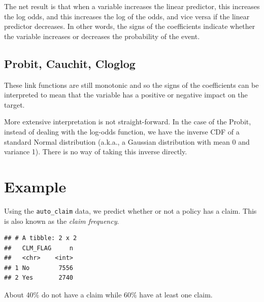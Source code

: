 \documentclass[openany]{book}
\newenvironment{Shaded}{\begin{snugshade}}{\end{snugshade}}
\newcommand{\KeywordTok}[1]{\textcolor[rgb]{0.13,0.29,0.53}{\textbf{#1}}}
\newcommand{\NormalTok}[1]{#1}
\newcommand{\OperatorTok}[1]{\textcolor[rgb]{0.81,0.36,0.00}{\textbf{#1}}}
\newcommand{\StringTok}[1]{\textcolor[rgb]{0.31,0.60,0.02}{#1}}
\begin{document}
The net result is that when a variable increases the linear predictor, this increases the log odds, and this increases the log of the odds, and vice versa if the linear predictor decreases. In other words, the signs of the coefficients indicate whether the variable increases or decreases the probability of the event.

\hypertarget{probit-cauchit-cloglog}{%
\subsection{Probit, Cauchit, Cloglog}\label{probit-cauchit-cloglog}}

These link functions are still monotonic and so the signs of the coefficients can be interpreted to mean that the variable has a positive or negative impact on the target.

More extensive interpretation is not straight-forward. In the case of the Probit, instead of dealing with the log-odds function, we have the inverse CDF of a standard Normal distribution (a.k.a., a Gaussian distribution with mean 0 and variance 1). There is no way of taking this inverse directly.

\hypertarget{example-1}{%
\section{Example}\label{example-1}}

Using the \texttt{auto\_claim} data, we predict whether or not a policy has a claim. This is also known as the \emph{claim frequency}.

\begin{Shaded}
\end{Shaded}

\begin{verbatim}
## # A tibble: 2 x 2
##   CLM_FLAG     n
##   <chr>    <int>
## 1 No        7556
## 2 Yes       2740
\end{verbatim}

About 40\% do not have a claim while 60\% have at least one claim.
\end{document}
